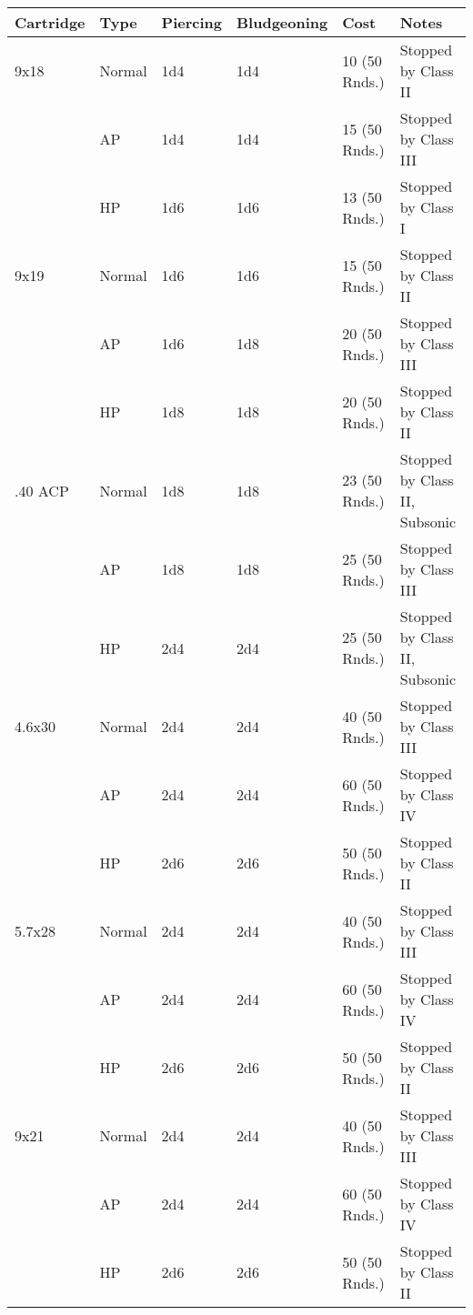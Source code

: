 \begin{center}
  \begin{tabular}{| l | l | l | l | l | l |}
    \hline
    \textbf{Cartridge}  & \textbf{Type}   & \textbf{Piercing} &
    \textbf{Bludgeoning} & \textbf{Cost}  & \textbf{Notes}        \\ \hline

    9x18    & Normal & 1d4  & 1d4  & 10 (50 Rnds.) & Stopped by Class II \\ \hline
    \,      & AP     & 1d4  & 1d4  & 15 (50 Rnds.) & Stopped by Class III \\ \hline
    \,      & HP     & 1d6  & 1d6  & 13 (50 Rnds.) & Stopped by Class I \\ \hline
    9x19    & Normal & 1d6  & 1d6  & 15 (50 Rnds.) & Stopped by Class II \\ \hline
    \,      & AP     & 1d6  & 1d8  & 20 (50 Rnds.) & Stopped by Class III \\ \hline
    \,      & HP     & 1d8  & 1d8  & 20 (50 Rnds.) & Stopped by Class II \\ \hline
    .40 ACP & Normal & 1d8  & 1d8  & 23 (50 Rnds.) & Stopped by Class II, Subsonic \\ \hline
    \,      & AP     & 1d8  & 1d8  & 25 (50 Rnds.) & Stopped by Class III \\ \hline
    \,      & HP     & 2d4  & 2d4  & 25 (50 Rnds.) & Stopped by Class II, Subsonic \\ \hline
    4.6x30  & Normal & 2d4  & 2d4  & 40 (50 Rnds.) & Stopped by Class III \\ \hline
    \,      & AP     & 2d4  & 2d4  & 60 (50 Rnds.) & Stopped by Class IV \\ \hline
    \,      & HP     & 2d6  & 2d6  & 50 (50 Rnds.) & Stopped by Class II \\ \hline
    5.7x28  & Normal & 2d4  & 2d4  & 40 (50 Rnds.) & Stopped by Class III \\ \hline
    \,      & AP     & 2d4  & 2d4  & 60 (50 Rnds.) & Stopped by Class IV \\ \hline
    \,      & HP     & 2d6  & 2d6  & 50 (50 Rnds.) & Stopped by Class II \\ \hline
    9x21    & Normal & 2d4  & 2d4  & 40 (50 Rnds.) & Stopped by Class III \\ \hline
    \,      & AP     & 2d4  & 2d4  & 60 (50 Rnds.) & Stopped by Class IV \\ \hline
    \,      & HP     & 2d6  & 2d6  & 50 (50 Rnds.) & Stopped by Class II \\ \hline

  \end{tabular}
\end{center}


